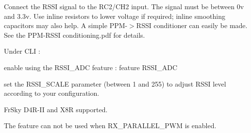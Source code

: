 Connect the R\+S\+S\+I signal to the R\+C2/\+C\+H2 input. The signal must be between 0v and 3.\+3v. Use inline resistors to lower voltage if required; inline smoothing capacitors may also help. A simple P\+P\+M-\/$>$R\+S\+S\+I conditioner can easily be made. See the P\+P\+M-\/\+R\+S\+S\+I conditioning.\+pdf for details.

Under C\+L\+I \+:
\begin{DoxyItemize}
\item enable using the R\+S\+S\+I\+\_\+\+A\+D\+C feature \+: {\ttfamily feature R\+S\+S\+I\+\_\+\+A\+D\+C}
\item set the R\+S\+S\+I\+\_\+\+S\+C\+A\+L\+E parameter (between 1 and 255) to adjust R\+S\+S\+I level according to your configuration.
\end{DoxyItemize}

Fr\+Sky D4\+R-\/\+I\+I and X8\+R supported.

The feature can not be used when R\+X\+\_\+\+P\+A\+R\+A\+L\+L\+E\+L\+\_\+\+P\+W\+M is enabled. 